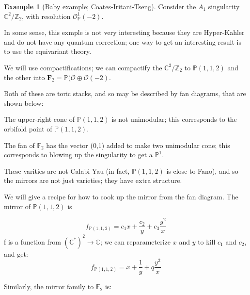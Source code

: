 \documentclass{amsart}
\theoremstyle{definition}
\newtheorem{example}[dummy]{Example}
\newcommand{\Z}{\mathbb{Z}}
\newcommand{\OO}{\mathcal{O}}
\newcommand{\proj}{\mathbb{P}}
\newcommand{\C}{\mathbb{C}}
\begin{document}
\begin{example}[Baby example; Coates-Iritani-Tseng]
Consider the $A_1$ singularity $\C^2/\Z_2$, with resolution $\OO_\proj^1(-2)$.

In some sense, this exmple is not very interesting because they are Hyper-Kahler and do not have any quantum correction; one way to get an interesting result is to use the equivariant theory.

We will use compactifications; we can compactify the $\C^2/\Z_2$ to $\proj(1,1,2)$ and the other into $\mathbf{F}_2=\proj(\OO\oplus\OO(-2)$.

Both of these are toric stacks, and so may be described by fan diagrams, that are shown below:

\begin{center}
\end{center}
The upper-right cone of $\proj(1,1,2)$ is not unimodular; this corresponds to the orbifold point of $\proj(1,1,2)$. 

The fan of $\mathbb{F}_2$ has the vector (0,1) added to make two unimodular cone; this corresponds to blowing up the singularity to get a $\proj^1$.


These varities are not Calabi-Yau (in fact, $\proj(1,1,2)$ is close to Fano), and so the mirrors are not just varieties; they have extra structure.

  We will give a recipe for how to cook up the mirror from the fan diagram.
The mirror of $\proj(1,1,2)$ is

$$f_{\proj(1,1,2)}=c_1x+\frac{c_2}{y}+c_3\frac{y^2}{x}$$
f is a function from $(\C^*)^2\to\C$; we can reparameterize $x$ and $y$ to kill $c_1$ and $c_2$, and get:
$$f_{\proj(1,1,2)}=x+\frac{1}{y}+q\frac{y^2}{x}$$

Similarly, the mirror family to $\mathbb{F}_2$ is:


\end{example}
\end{document}
